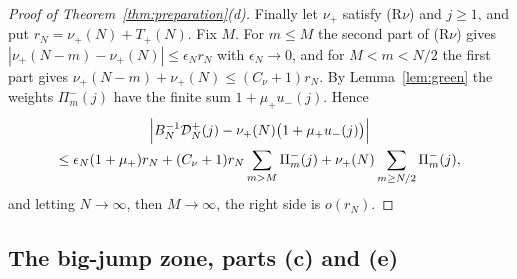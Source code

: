 \begin{proof}[Proof of Theorem~\ref{thm:preparation}(d)]
Finally let $\nu_\plus$ satisfy (R$\nu$) and $j\ge1$, and put $r_N=\nu_\plus(N)+T_\plus(N)$.
Fix $M$. For $m\le M$ the second part of (R$\nu$) gives
$|\nu_\plus(N-m)-\nu_\plus(N)|\le\epsilon_Nr_N$ with $\epsilon_N\to0$, and for $M<m<N/2$ the first
part gives $\nu_\plus(N-m)+\nu_\plus(N)\le(C_\nu+1)r_N$. By Lemma~\ref{lem:green} the weights
$\Pi^\minus_m(j)$ have the finite sum $1+\mu_\plus u_\minus(j)$. Hence
\begin{multline*}
 \Bigl|B_N^{-1}\mathcal D^{+}_N(j)-\nu_{+}(N)\bigl(1+\mu_{+} u_{-}(j)\bigr)\Bigr|\\
 \le\epsilon_N(1+\mu_{+})r_N+(C_\nu+1)r_N\sum_{m>M}\Pi^{-}_m(j)+\nu_{+}(N)\sum_{m\ge N/2}\Pi^{-}_m(j),
\end{multline*}
and letting $N\to\infty$, then $M\to\infty$, the right side is $o(r_N)$.
\end{proof}

\subsection{The big-jump zone, parts (c) and (e)}\label{sec:prep-bigjump}

